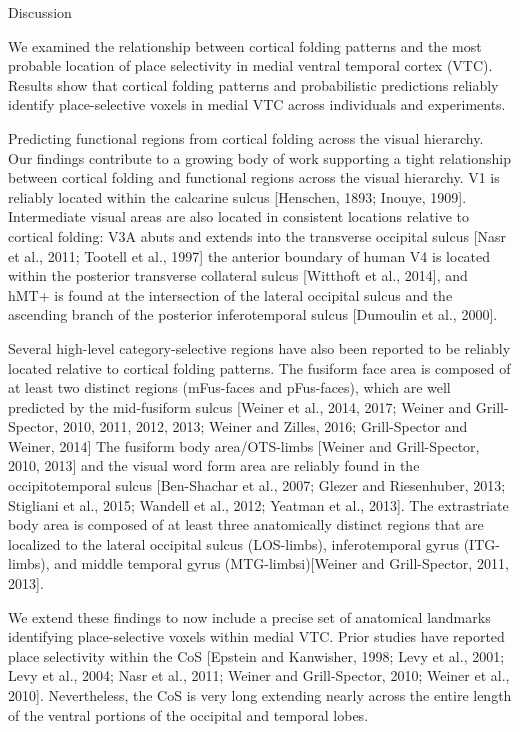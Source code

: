 Discussion

We examined the relationship between cortical folding patterns and the most
probable location of place selectivity in medial ventral temporal cortex (VTC).
%
Results show that cortical folding patterns and probabilistic predictions
reliably identify place-selective voxels in medial VTC across individuals and
experiments.


Predicting functional regions from cortical folding across the visual hierarchy.
%
Our findings contribute to a growing body of work supporting a tight
relationship between cortical folding and functional regions across the visual
hierarchy.
%
V1 is reliably located within the calcarine sulcus [Henschen, 1893; Inouye,
1909].
%
Intermediate visual areas are also located in consistent locations relative to
cortical folding:
%
V3A abuts and extends into the transverse occipital sulcus [Nasr et al., 2011;
Tootell et al., 1997]
%
the anterior boundary of human V4 is located within the posterior transverse
collateral sulcus [Witthoft et al., 2014], and
%
hMT+ is found at the intersection of the lateral occipital sulcus and the
ascending branch of the posterior inferotemporal sulcus [Dumoulin et al., 2000].

%
Several high-level category-selective regions have also been reported to be
reliably located relative to cortical folding patterns.
%
The fusiform face area is composed of at least two distinct regions (mFus-faces
and pFus-faces), which are well predicted by the mid-fusiform sulcus [Weiner et
al., 2014, 2017; Weiner and Grill-Spector, 2010, 2011, 2012, 2013; Weiner and
Zilles, 2016; Grill-Spector and Weiner, 2014]
%
The fusiform body area/OTS-limbs [Weiner and Grill-Spector, 2010, 2013] and the
visual word form area are reliably found in the occipitotemporal sulcus
[Ben-Shachar et al., 2007; Glezer and Riesenhuber, 2013; Stigliani et al., 2015;
Wandell et al., 2012; Yeatman et al., 2013].
%
The extrastriate body area is composed of at least three anatomically
distinct regions that are localized to the lateral occipital sulcus (LOS-limbs),
inferotemporal gyrus (ITG-limbs), and middle temporal gyrus (MTG-limbsi)[Weiner
and Grill-Spector, 2011, 2013].

%
We extend these findings to now include a precise set of anatomical landmarks
identifying place-selective voxels within medial VTC.
%
Prior studies have reported place selectivity within the CoS [Epstein and
Kanwisher, 1998; Levy et al., 2001; Levy et al., 2004; Nasr et al., 2011; Weiner
and Grill-Spector, 2010; Weiner et al., 2010].
%
Nevertheless, the CoS is very long extending nearly across the entire length of
the ventral portions of the occipital and temporal lobes.


